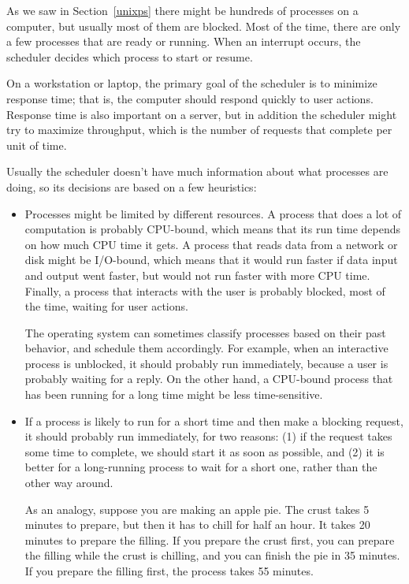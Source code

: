 \documentclass[12pt]{book}
\begin{document}
{As we saw in Section~\ref{unixps} there might be hundreds of
processes on a computer, but usually most of them are blocked.  Most
of the time, there are only a few processes that are ready or running.
When an interrupt occurs, the scheduler decides which process to start
or resume.

On a workstation or laptop, the primary goal of the scheduler is to
minimize response time; that is, the computer should respond quickly
to user actions.  Response time is also important on a server, but in
addition the scheduler might try to maximize throughput, which is the
number of requests that complete per unit of time.

Usually the scheduler doesn't have much information about what
processes are doing, so its decisions are based on a few
heuristics:

\begin{itemize}

\item Processes might be limited by different resources.  A process
that does a lot of computation is probably CPU-bound, which means that
its run time depends on how much CPU time it gets.  A process that
reads data from a network or disk might be I/O-bound, which means that
it would run faster if data input and output went faster, but would not
run faster with more CPU time.  Finally, a process that interacts with
the user is probably blocked, most of the time, waiting for user actions.

The operating system can sometimes classify processes based on their
past behavior, and schedule them accordingly.  For example, when an
interactive process is unblocked, it should probably run immediately,
because a user is probably waiting for a reply.  On the other hand,
a CPU-bound process that has been running for a long time might be
less time-sensitive.

\item If a process is likely to run for a short time and then make
a blocking request, it should probably run immediately, for two reasons:
(1) if the request takes some time to complete, we should start it as soon
as possible, and (2) it is better for a long-running process to wait
for a short one, rather than the other way around.

As an analogy, suppose you are making an apple pie.  The crust takes
5 minutes to prepare, but then it has to chill for half an hour.  It takes
20 minutes to prepare the filling.  If you prepare the crust first,
you can prepare the filling while the crust is chilling, and you can
finish the pie in 35 minutes.  If you prepare the filling first, the
process takes 55 minutes.


\end{itemize}}
\end{document}

